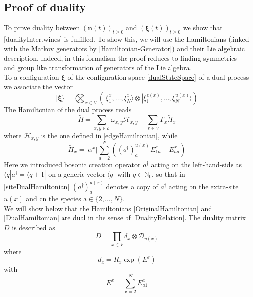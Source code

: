 \documentclass[11pt]{article}
\numberwithin{equation}{section}
\numberwithin{equation}{subsection}
\newcommand{\dd}{\mathcal{D}_{u(x)}}
\begin{document}
\subsection{Proof of duality}
To prove duality between $(\bm{n}(t))_{t\geq 0}$ and $(\bm{\xi}(t))_{t\geq 0}$ we  show that \eqref{dualityIntertwines} is fulfilled.  To show this, we will use the Hamiltonians (linked with the Markov generators by \eqref{Hamiltonian-Generator}) and their Lie algebraic description. Indeed, in this formalism the proof reduces to finding symmetries and group like transformation of generators of the Lie algebra.\\
To a configuration $\bm{\xi}$ of the configuration space  \eqref{dualStateSpace} of a dual process we associate the vector
\begin{equation}
    |\bm{\xi}\rangle=\bigotimes_{x\in V}\left(|\xi_{1}^{x},\ldots,\xi_{N}^{x}\rangle\otimes |\xi_{1}^{u(x)},\ldots,\xi_{N}^{u(x)}\rangle\right)
\end{equation}
The Hamiltonian of the dual process reads
\begin{equation}\label{DualHamiltonian}
    \widetilde{H}=\sum_{x,y\in \mathcal{E}}\omega_{x,y}\mathcal{H}_{x,y}+\sum_{x\in V}\Gamma_{x}\widetilde{H}_{x}
\end{equation}
where $\mathcal{H}_{x,y}$ is the one defined in \eqref{edgeHamiltonian}, while 
\begin{equation}\label{siteDualHamiltonian}
    \widetilde{H}_{x}=|\alpha^{x}|\sum_{a=2}^{N}\left((a^{\dagger})_{a}^{u(x)}\,E_{1a}^{x}-E_{aa}^{x}\right)
\end{equation}
Here we introduced bosonic creation operator $a^{\dagger}$ acting on the left-hand-side as $\langle q|a^{\dagger}=\langle q+1|$ on a generic vector $\langle q|$ with $q\in \mathbb{N}_{0}$, so that in \eqref{siteDualHamiltonian} 
$(a^{\dagger})_{a}^{u(x)}$ denotes a copy of $a^{\dagger}$ acting on the extra-site $u(x)$ and on the species $a\in\{2,\ldots,N\}$. \\
We will show below that the Hamiltonians \eqref{OriginalHamiltonian} and \eqref{DualHamiltonian} are dual in the sense of \eqref{DualityRelation}. The duality matrix $D$ is described as 
\begin{equation}\label{dualityMatrix}
    D=\prod_{x\in V}d_{x}\otimes \dd
\end{equation}
where
\begin{equation}\label{bulkElementDualityMatrix}
d_{x}=R_{x}\exp{(E^{x})}
\end{equation}
with 
\begin{equation}\label{EquationEx}
E^{x}=\sum_{a=2}^{N}E_{a1}^{x}
\end{equation}
\end{document}
